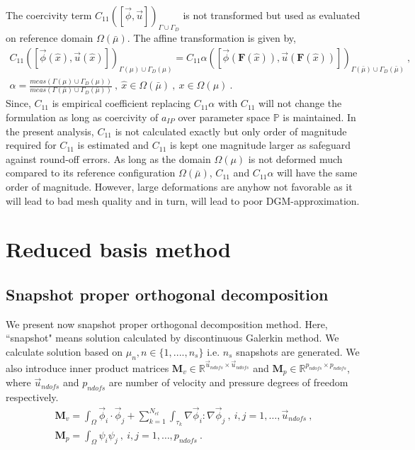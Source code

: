 \documentclass[graybox]{svmult}
\begin{document}
The coercivity term $C_{11}\left( [\overrightarrow{\phi},\overrightarrow{u}] \right)_{\Gamma \cup \Gamma_D}$ is not transformed but used as evaluated on reference domain $\Omega(\bar{\mu})$. The affine transformation is given by,
\begin{equation}
\begin{split}
C_{11}\left( [\overrightarrow{\phi}(\hat{x}),\overrightarrow{u}(\hat{x})] \right)_{\Gamma(\mu) \cup \Gamma_D(\mu)} = C_{11} \alpha \left( [\overrightarrow{\phi}(\bm{F}(\hat{x})),\overrightarrow{u}(\bm{F}(\hat{x}))] \right)_{\Gamma(\bar{\mu}) \cup \Gamma_D(\bar{\mu})} \ , \\
\alpha = \frac{meas\left( \Gamma(\mu) \cup \Gamma_D(\mu)\right)}{meas\left( \Gamma(\bar{\mu}) \cup \Gamma_D(\bar{\mu})\right)} \ , \ \hat{x} \in \Omega(\bar{\mu}) \ , \ x \in \Omega(\mu) \ .
\end{split}
\end{equation}
Since, $C_{11}$ is empirical coefficient replacing $C_{11} \alpha$ with $C_{11}$ will not change the formulation as long as coercivity of $a_{IP}$ over parameter space $\mathbb{P}$ is maintained. In the present analysis, $C_{11}$ is not calculated exactly but only order of magnitude required for $C_{11}$ is estimated and $C_{11}$ is kept one magnitude larger as safeguard against round-off errors. As long as the domain $\Omega(\mu)$ is not deformed much compared to its reference configuration $\Omega(\bar{\mu})$, $C_{11}$ and $C_{11}\alpha$ will have the same order of magnitude. However, large deformations are anyhow not favorable as it will lead to bad mesh quality and in turn, will lead to poor DGM-approximation.

\section{Reduced basis method}

\subsection{Snapshot proper orthogonal decomposition}\label{POD_section}

We present now snapshot proper orthogonal decomposition method. Here, ``snapshot" means solution calculated by discontinuous Galerkin method. We calculate solution based on $\mu_n, n \in \lbrace 1,....,n_s \rbrace$ i.e. $n_s$ snapshots are generated. We also introduce inner product matrices $\bm{M}_v \in \mathbb{R}^{\overrightarrow{u}_{ndofs} \times \overrightarrow{u}_{ndofs}}$ and $\bm{M}_p \in \mathbb{R}^{p_{ndofs} \times p_{ndofs}}$, where $\overrightarrow{u}_{ndofs}$ and $p_{ndofs}$ are number of velocity and pressure degrees of freedom respectively.
\begin{gather*}
\bm{M}_v = \int_{\Omega} \overrightarrow{\phi}_i \cdot \overrightarrow{\phi}_j + \sum_{k=1}^{N_{el}} \int_{\tau_k} \nabla \overrightarrow{\phi}_i : \nabla \overrightarrow{\phi}_j \ , \ i,j = 1, \ldots, \overrightarrow{u}_{ndofs} \ , \\
\bm{M}_p = \int_{\Omega} \psi_i \psi_j \ , \ i,j = 1, \ldots, p_{ndofs} \ .
\end{gather*}
\end{document}
